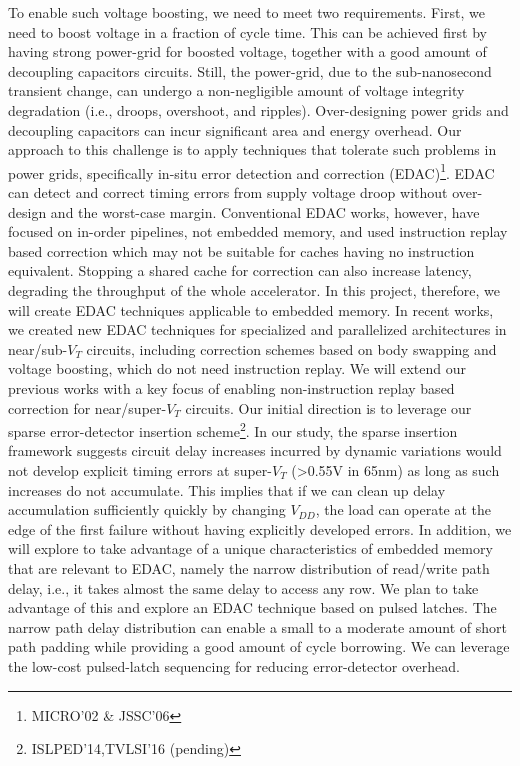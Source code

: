 To enable such voltage boosting, we need to meet two requirements. First, we need to boost voltage in a fraction of cycle time. This can be achieved first by having strong power-grid for boosted voltage, together with a good amount of decoupling capacitors circuits. Still, the power-grid, due to the sub-nanosecond transient change, can undergo a non-negligible amount of voltage integrity degradation (i.e., droops, overshoot, and ripples). Over-designing power grids and decoupling capacitors can incur significant area and energy overhead. Our approach to this challenge is to apply techniques that tolerate such problems in power grids, specifically in-situ error detection and correction (EDAC)\footnote{MICRO'02 \& JSSC'06}. EDAC can detect and correct timing errors from supply voltage droop without over-design and the worst-case margin. Conventional EDAC works, however, have focused on in-order pipelines, not embedded memory, and used instruction replay based correction which may not be suitable for caches having no instruction equivalent. Stopping a shared cache for correction can also increase latency, degrading the throughput of the whole accelerator. In this project, therefore, we will create EDAC techniques applicable to embedded memory. In recent works, we created new EDAC techniques for specialized and parallelized architectures in near/sub-$V_T$ circuits, including correction schemes based on body swapping and voltage boosting, which do not need instruction replay. We will extend our previous works with a key focus of enabling non-instruction replay based correction for near/super-$V_T$ circuits. Our initial direction is to leverage our sparse error-detector insertion scheme\footnote{ISLPED'14,TVLSI'16 (pending)}. In our study, the sparse insertion framework suggests circuit delay increases incurred by dynamic variations would not develop explicit timing errors at super-$V_T$ (>0.55V in 65nm) as long as such increases do not accumulate. This implies that if we can clean up delay accumulation sufficiently quickly by changing $V_{DD}$, the load can operate at the edge of the first failure without having explicitly developed errors. In addition, we will explore to take advantage of a unique characteristics of embedded memory that are relevant to EDAC, namely the narrow distribution of read/write path delay, i.e., it takes almost the same delay to access any row. We plan to take advantage of this and explore an EDAC technique based on pulsed latches. The narrow path delay distribution can enable a small to a moderate amount of short path padding while providing a good amount of cycle borrowing. We can leverage the low-cost pulsed-latch sequencing \cite{jin_asscc16} for reducing error-detector overhead.


